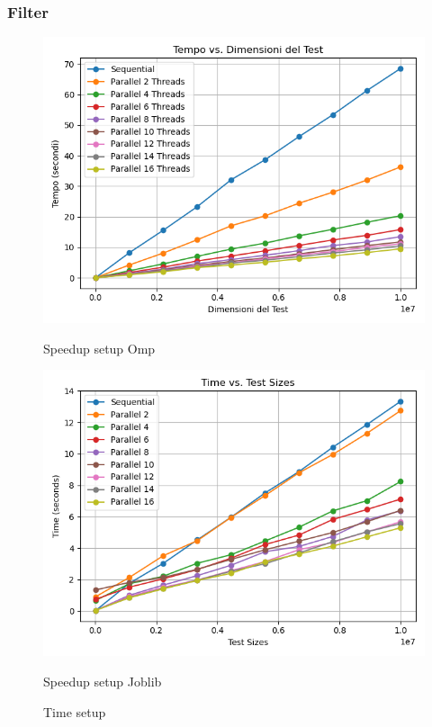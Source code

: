 \documentclass[11pt]{article}
\begin{document}
    \subsubsection{Filter}\label{subsubsec:fpr-005-filter}
    \begin{figure}[H]
        \centering
        \includegraphics[width=\linewidth]{omp/005/filter_time_plot}
            \caption{Speedup setup Omp}\label{fig:005-filter_time_omp}
        \endminipage\hfill
        \includegraphics[width=\linewidth]{joblib/005/filter_time_plot}
            \caption{Speedup setup Joblib}\label{fig:005-filter_time_joblib}
        \endminipage\hfill
        \caption{Time setup}
    \end{figure}
\end{document}
